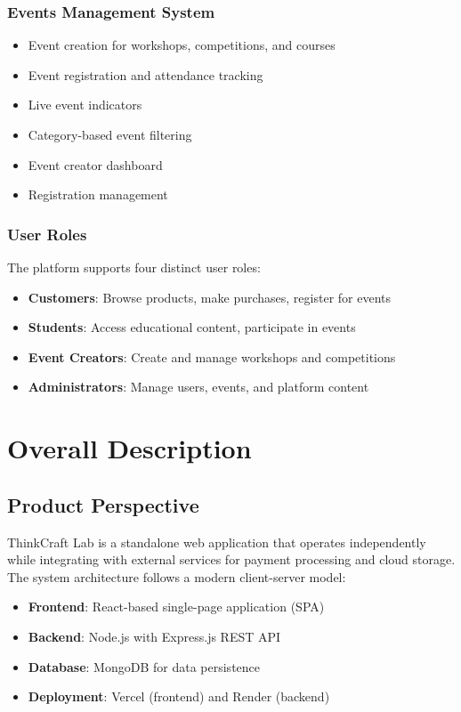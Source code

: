 \documentclass{scrreprt}
\begin{document}
\subsection{Events Management System}
\begin{itemize}
\item Event creation for workshops, competitions, and courses
\item Event registration and attendance tracking
\item Live event indicators
\item Category-based event filtering
\item Event creator dashboard
\item Registration management
\end{itemize}

\subsection{User Roles}
The platform supports four distinct user roles:
\begin{itemize}
\item \textbf{Customers}: Browse products, make purchases, register for events
\item \textbf{Students}: Access educational content, participate in events
\item \textbf{Event Creators}: Create and manage workshops and competitions
\item \textbf{Administrators}: Manage users, events, and platform content
\end{itemize}


\chapter{Overall Description}

\section{Product Perspective}
ThinkCraft Lab is a standalone web application that operates independently while integrating with external services for payment processing and cloud storage. The system architecture follows a modern client-server model:

\begin{itemize}
\item \textbf{Frontend}: React-based single-page application (SPA)
\item \textbf{Backend}: Node.js with Express.js REST API
\item \textbf{Database}: MongoDB for data persistence
\item \textbf{Deployment}: Vercel (frontend) and Render (backend)
\end{itemize}
\end{document}

